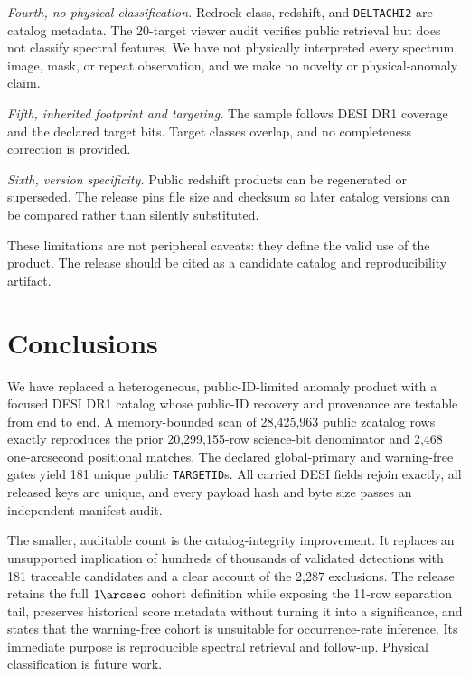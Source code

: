 \documentclass[twocolumn]{aastex701}
\begin{document}
\textit{Fourth, no physical classification.}  Redrock class, redshift, and \texttt{DELTACHI2} are
catalog metadata.  The 20-target viewer audit verifies public retrieval but does not classify
spectral features.  We have not physically interpreted every spectrum, image, mask, or repeat
observation, and we make no novelty or physical-anomaly claim.

\textit{Fifth, inherited footprint and targeting.}  The sample follows DESI DR1 coverage and the
declared target bits.  Target classes overlap, and no completeness correction is provided.

\textit{Sixth, version specificity.}  Public redshift products can be regenerated or superseded.
The release pins file size and checksum so later catalog versions can be compared rather than
silently substituted.

These limitations are not peripheral caveats: they define the valid use of the product.  The
release should be cited as a candidate catalog and reproducibility artifact.

\section{Conclusions}\label{sec:conclusions}

We have replaced a heterogeneous, public-ID-limited anomaly product with a focused DESI DR1
catalog whose public-ID recovery and provenance are testable from end to end.  A memory-bounded scan of
28,425,963 public zcatalog rows exactly reproduces the prior 20,299,155-row science-bit denominator
and 2,468 one-arcsecond positional matches.  The declared global-primary and warning-free gates
yield 181 unique public \texttt{TARGETID}s.  All carried DESI fields rejoin exactly, all released
keys are unique, and every payload hash and byte size passes an independent manifest audit.

The smaller, auditable count is the catalog-integrity improvement.  It replaces an unsupported implication of
hundreds of thousands of validated detections with 181 traceable candidates and a clear account
of the 2,287 exclusions.  The release retains the full $1\arcsec$ cohort definition while exposing
the 11-row separation tail, preserves historical score metadata without turning it into a
significance, and states that the warning-free cohort is unsuitable for occurrence-rate
inference.  Its immediate purpose is reproducible spectral retrieval and follow-up.  Physical
classification is future work.
\end{document}
